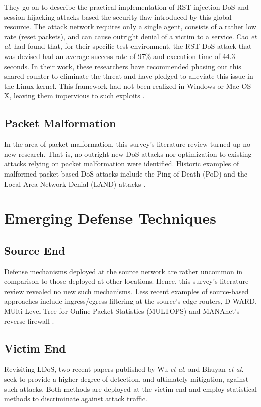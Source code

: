 \documentclass[conference]{IEEEtran}
\begin{document}
They go on to describe the practical implementation of RST injection DoS and session hijacking attacks based the security flaw introduced by this global resource. The attack network requires only a single agent, consists of a rather low rate (reset packets), and can cause outright denial of a victim to a service. Cao \textit{et al.} had found that, for their specific test environment, the RST DoS attack that was devised had an average success rate of 97\% and execution time of 44.3 seconds. In their work, these researchers have recommended phasing out this shared counter to eliminate the threat and have pledged to alleviate this issue in the Linux kernel. This framework had not been realized in Windows or Mac OS X, leaving them impervious to such exploits \cite{OffPath:Cao}.

\subsection{Packet Malformation}
In the area of packet malformation, this survey's literature review turned up no new research. That is, no outright new DoS attacks nor optimization to existing attacks relying on packet malformation were identified. Historic examples of malformed packet based DoS attacks include the Ping of Death (PoD) and the Local Area Network Denial (LAND) attacks \cite{SecuringCloudServers:Chapade}. 

\section{Emerging Defense Techniques}
\subsection{Source End}
Defense mechanisms deployed at the source network are rather uncommon in comparison to those deployed at other locations. Hence, this survey's literature review revealed no new such mechanisms. Less recent examples of source-based approaches include ingress/egress filtering at the source's edge routers, D-WARD, MUlti-Level Tree for Online Packet Statistics (MULTOPS) and MANAnet's reverse firewall \cite{Zargar:DDOSFlood}.

\subsection{Victim End}
Revisiting LDoS, two recent papers published by Wu \textit{et al.} \cite{Wu:LDoSMultifractal} and Bhuyan \textit{et al.} \cite{Bhuyan:partialRank} seek to provide a higher degree of detection, and ultimately mitigation, against such attacks. Both methods are deployed at the victim end and employ statistical methods to discriminate against attack traffic.
\end{document}
